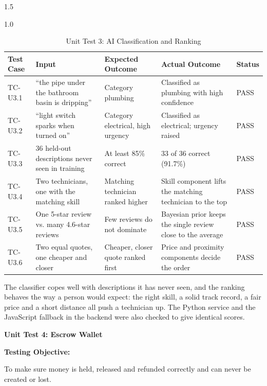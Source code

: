 \documentclass[A4paper,12pt]{report}
\theoremstyle{plain}
\theoremstyle{definition}
\theoremstyle{remark}
\numberwithin{equation}{section}
\begin{document}
\begin{spacing}{1.5}
\begin{table}[H]
\centering
\caption{Unit Test 3: AI Classification and Ranking}
\begin{spacing}{1.0}
{\small
\begin{tabular}{|p{}|p{}|p{}|p{}|p{}|}
\hline
\textbf{Test Case} & \textbf{Input} & \textbf{Expected Outcome} & \textbf{Actual Outcome} & \textbf{Status} \\ \hline
TC-U3.1 & ``the pipe under the bathroom basin is dripping'' & Category plumbing & Classified as plumbing with high confidence & PASS \\ \hline
TC-U3.2 & ``light switch sparks when turned on'' & Category electrical, high urgency & Classified as electrical; urgency raised & PASS \\ \hline
TC-U3.3 & 36 held-out descriptions never seen in training & At least 85\% correct & 33 of 36 correct (91.7\%) & PASS \\ \hline
TC-U3.4 & Two technicians, one with the matching skill & Matching technician ranked higher & Skill component lifts the matching technician to the top & PASS \\ \hline
TC-U3.5 & One 5-star review vs. many 4.6-star reviews & Few reviews do not dominate & Bayesian prior keeps the single review close to the average & PASS \\ \hline
TC-U3.6 & Two equal quotes, one cheaper and closer & Cheaper, closer quote ranked first & Price and proximity components decide the order & PASS \\ \hline
\end{tabular}}
\end{spacing}
\end{table}

The classifier copes well with descriptions it has never seen, and the ranking behaves the way a person would expect: the right skill, a solid track record, a fair price and a short distance all push a technician up. The Python service and the JavaScript fallback in the backend were also checked to give identical scores.

\textbf{Unit Test 4: Escrow Wallet}

\textbf{Testing Objective:}

To make sure money is held, released and refunded correctly and can never be created or lost.


\end{spacing}
\end{document}
